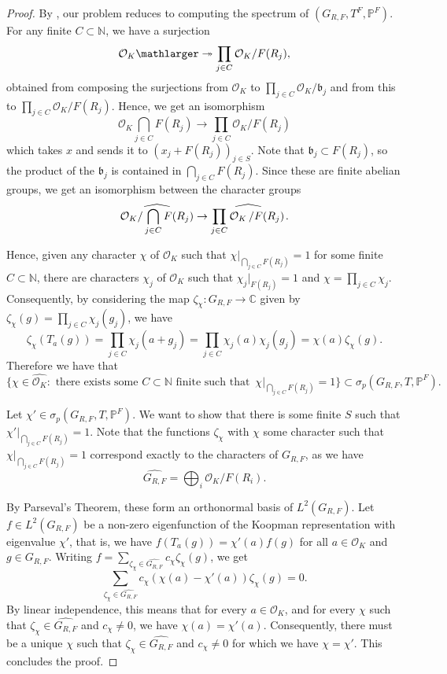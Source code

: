 \documentclass[a4paper,11pt,reqno]{amsart}
\theoremstyle{plain}
\theoremstyle{remark}
\newcommand{\co}{\mathcal{O}}
\newcommand{\gb}{\mathfrak{b}}
\newcommand{\grf}{G_{R,F}}
\newcommand{\mmp}{\mathbb{P}}
\begin{document}
			\begin{proof}
				By  , our problem reduces to computing the spectrum of $(\grf,T^F,\mmp^F)$. For any finite $C \subset \mathbb{N}$, we have a surjection $$\co_K \mathlarger \twoheadrightarrow \prod_{j\in C} \co_K/F(R_j),$$ obtained from composing the surjections from $\co_K$ to $\prod_{j\in C}\co_K/\gb_j$ and from this to $\prod_{j\in C}\co_K/F(R_j)$. Hence, we get an isomorphism $$\co_K\bigcap_{j\in C} F(R_j)  \rightarrow  \prod_{j\in C}\co_K/F(R_j)$$ which takes $x$ and sends it to $(x_j+F(R_j))_{j\in S}$. Note that $\gb_j \subset F(R_j)$, so the product of the $\gb_j$ is contained in $\bigcap_{j\in C} F(R_j)$. Since these are finite abelian groups, we get an isomorphism between the character groups $$
				\widehat{\mathcal{O}_K / \bigcap_{j \in C} F(R_j)} \rightarrow \widehat{\prod_{j \in C} \mathcal{O}_K \left/ F(R_j) \right.} .
				$$
				
				Hence, given any character $\chi$ of $\co_K$ such that $ \chi\vert_{\bigcap_{j\in C}F(R_j)} = 1$ for some finite $C \subset \mathbb{N}$, there are characters $\chi_j$ of $\co_K$ such that $\chi_j\vert_{F(R_j)} = 1$ and $\chi = \prod_{j\in C} \chi_j$. Consequently, by considering the map $\zeta_\chi:\grf \rightarrow \mathbb{C}$ given by $\zeta_\chi(g) = \prod_{j\in C}\chi_j(g_j)$, we have $$\zeta_\chi(T_a(g)) = \prod_{j\in C}\chi_j(a+g_j) = \prod_{j\in C}\chi_j(a)\chi_j(g_j) = \chi(a)\zeta_\chi(g).$$ Therefore we have that $$ \{\chi \in \widehat{\co_K}: \text{ there exists some } C \subset \mathbb{N} \text{ finite such that } \hspace{2pt}   \chi\vert_{\bigcap_{j\in C}F(R_j)} = 1\} \subset \sigma_p(\grf,T, \mmp^F).$$
				
				Let $\chi' \in \sigma_p(\grf,T, \mmp^F).$ We want to show that there is some finite $S$ such that $\chi'\vert_{\bigcap_{j\in C}F(R_j)} = 1$. Note that the functions $\zeta_\chi$ with $\chi$ some character such that $\chi\vert_{\bigcap_{j\in C}F(R_j)} = 1$ correspond exactly to the characters of $\grf$, as we have $$\widehat{\grf} = \bigoplus_i \co_K/F(R_i).$$
				
				By Parseval's Theorem, these form an orthonormal basis of $L^2(\grf)$. Let $f\in L^2(\grf)$ be a non-zero eigenfunction of the Koopman representation with eigenvalue $\chi'$, that is,  we have $f(T_{a}(g)) = \chi'(a)f(g)$ for all $a\in \co_K$ and $g \in \grf$. Writing  $f = \sum_{\zeta_{\chi} \in \widehat{\grf}} c_{\chi} \zeta_{\chi}(g)$, we get $$\sum_{\zeta_{\chi} \in \widehat{\grf}} c_{\chi}(\chi(a)-\chi'(a)) \zeta_{\chi}(g) = 0.$$ By linear independence, this means that for every $a \in \co_K$, and for every $\chi$ such that $\zeta_{\chi} \in \widehat{\grf}$ and $c_\chi  \neq 0$, we have $\chi(a) = \chi'(a)$. Consequently, there must be a unique $\chi$ such that $\zeta_{\chi} \in \widehat{\grf}$ and $c_\chi  \neq 0$ for which we have $\chi = \chi'$. This concludes the proof.
			\end{proof}
			
\end{document}
